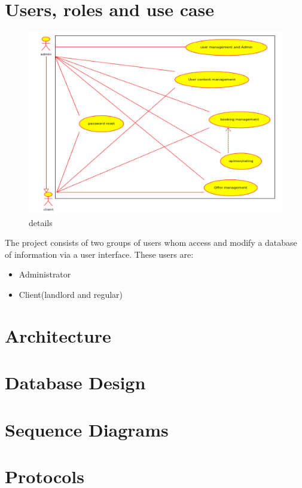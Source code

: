 \section{Users, roles and use case}
\begin{figure}[h!]
\includegraphics[scale=0.3]{img/updated_use_case.jpg}
\caption{details}
\end{figure}
The project consists of two groups of users whom access and modify a database of information via a user interface. These users are:
\begin{itemize}
\item Administrator 
\item Client(landlord and regular)
\end{itemize}
\newpage
\section{Architecture}
\section{Database Design}
\section{Sequence Diagrams}
\section{Protocols}